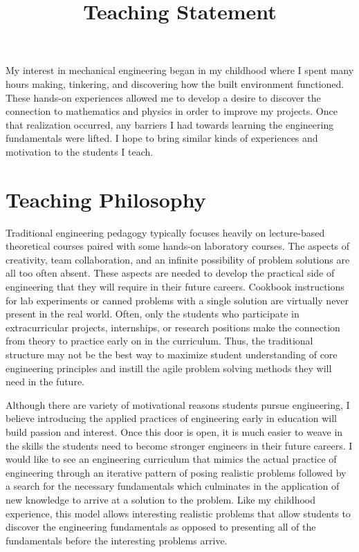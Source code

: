 \documentclass{article}
\title{Teaching Statement}
\date{}
\begin{document}

My interest in mechanical engineering began in my childhood where I spent many
hours making, tinkering, and discovering how the built environment functioned.
These hands-on experiences allowed me to develop a desire to discover the
connection to mathematics and physics in order to improve my projects. Once
that realization occurred, any barriers I had towards learning the engineering
fundamentals were lifted. I hope to bring similar kinds of experiences and
motivation to the students I teach.

\section*{Teaching Philosophy}
%
Traditional engineering pedagogy typically focuses heavily on lecture-based
theoretical courses paired with some hands-on laboratory courses. The aspects
of creativity, team collaboration, and an infinite possibility of problem
solutions are all too often absent. These aspects are needed to develop the
practical side of engineering that they will require in their future careers.
Cookbook instructions for lab experiments or canned problems with a single
solution are virtually never present in the real world.  Often, only the
students who participate in extracurricular projects, internships, or research
positions make the connection from theory to practice early on in the
curriculum. Thus, the traditional structure may not be the best way to maximize
student understanding of core engineering principles and instill the agile
problem solving methods they will need in the future.

Although there are variety of motivational reasons students pursue engineering,
I believe introducing the applied practices of engineering early in education
will build passion and interest. Once this door is open, it is much easier to
weave in the skills the students need to become stronger engineers in their
future careers. I would like to see an engineering curriculum that mimics the
actual practice of engineering through an iterative pattern of posing realistic
problems followed by a search for the necessary fundamentals which culminates
in the application of new knowledge to arrive at a solution to the problem.
Like my childhood experience, this model allows interesting realistic problems
that allow students to discover the engineering fundamentals as opposed to
presenting all of the fundamentals before the interesting problems arrive.
\end{document}
